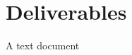 \documentclass[12pt]{article}
\begin{document}
\section*{Deliverables}
A text document

\end{document}
